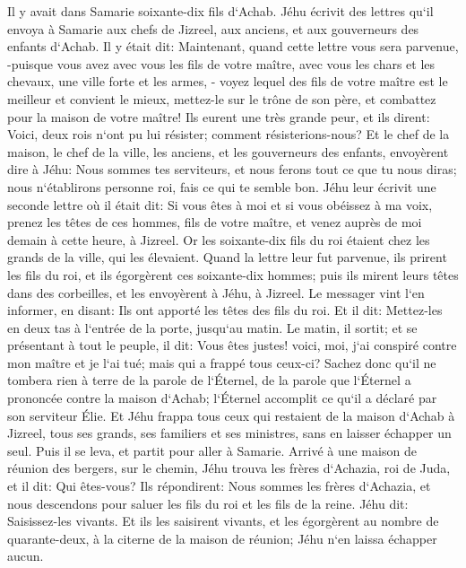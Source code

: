 \verse Il y avait dans Samarie soixante-dix fils d`Achab. Jéhu écrivit des lettres qu`il envoya à Samarie aux chefs de Jizreel, aux anciens, et aux gouverneurs des enfants d`Achab. Il y était dit: 
\verse Maintenant, quand cette lettre vous sera parvenue, -puisque vous avez avec vous les fils de votre maître, avec vous les chars et les chevaux, une ville forte et les armes, - 
\verse voyez lequel des fils de votre maître est le meilleur et convient le mieux, mettez-le sur le trône de son père, et combattez pour la maison de votre maître! 
\verse Ils eurent une très grande peur, et ils dirent: Voici, deux rois n`ont pu lui résister; comment résisterions-nous? 
\verse Et le chef de la maison, le chef de la ville, les anciens, et les gouverneurs des enfants, envoyèrent dire à Jéhu: Nous sommes tes serviteurs, et nous ferons tout ce que tu nous diras; nous n`établirons personne roi, fais ce qui te semble bon. 
\verse Jéhu leur écrivit une seconde lettre où il était dit: Si vous êtes à moi et si vous obéissez à ma voix, prenez les têtes de ces hommes, fils de votre maître, et venez auprès de moi demain à cette heure, à Jizreel. Or les soixante-dix fils du roi étaient chez les grands de la ville, qui les élevaient. 
\verse Quand la lettre leur fut parvenue, ils prirent les fils du roi, et ils égorgèrent ces soixante-dix hommes; puis ils mirent leurs têtes dans des corbeilles, et les envoyèrent à Jéhu, à Jizreel. 
\verse Le messager vint l`en informer, en disant: Ils ont apporté les têtes des fils du roi. Et il dit: Mettez-les en deux tas à l`entrée de la porte, jusqu`au matin. 
\verse Le matin, il sortit; et se présentant à tout le peuple, il dit: Vous êtes justes! voici, moi, j`ai conspiré contre mon maître et je l`ai tué; mais qui a frappé tous ceux-ci? 
\verse Sachez donc qu`il ne tombera rien à terre de la parole de l`Éternel, de la parole que l`Éternel a prononcée contre la maison d`Achab; l`Éternel accomplit ce qu`il a déclaré par son serviteur Élie. 
\verse Et Jéhu frappa tous ceux qui restaient de la maison d`Achab à Jizreel, tous ses grands, ses familiers et ses ministres, sans en laisser échapper un seul. 
\verse Puis il se leva, et partit pour aller à Samarie. Arrivé à une maison de réunion des bergers, sur le chemin, 
\verse Jéhu trouva les frères d`Achazia, roi de Juda, et il dit: Qui êtes-vous? Ils répondirent: Nous sommes les frères d`Achazia, et nous descendons pour saluer les fils du roi et les fils de la reine. 
\verse Jéhu dit: Saisissez-les vivants. Et ils les saisirent vivants, et les égorgèrent au nombre de quarante-deux, à la citerne de la maison de réunion; Jéhu n`en laissa échapper aucun. 
